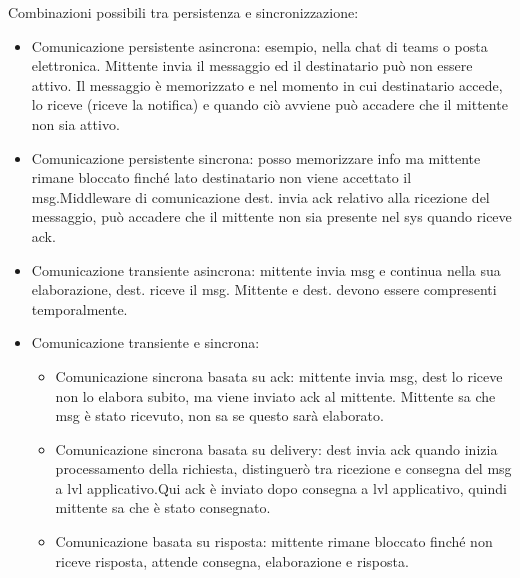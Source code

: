 \documentclass[16px]{article}
\begin{document}
Combinazioni possibili tra persistenza e sincronizzazione:\\
\begin{itemize}
\item Comunicazione persistente asincrona:
esempio, nella chat di teams o posta elettronica. Mittente invia il messaggio ed il destinatario può non essere attivo. Il messaggio è memorizzato e nel momento in cui destinatario accede, lo riceve (riceve la notifica) e quando ciò avviene può accadere che il mittente non sia attivo.
\item Comunicazione persistente sincrona: posso memorizzare info ma mittente rimane bloccato finché lato destinatario non viene accettato il msg.Middleware di comunicazione dest. invia ack relativo alla ricezione del messaggio, può accadere che il mittente non sia presente nel sys quando riceve ack.
\item Comunicazione transiente asincrona: mittente invia msg e continua nella sua elaborazione, dest. riceve il msg. Mittente e dest. devono essere compresenti temporalmente.
\item Comunicazione transiente e sincrona:
\begin{itemize}
\item Comunicazione sincrona basata su ack: mittente invia msg, dest lo riceve non lo elabora subito, ma viene inviato ack al mittente. Mittente sa che msg è stato ricevuto, non sa se questo sarà elaborato.
\item Comunicazione sincrona basata su delivery: dest invia ack quando inizia processamento della richiesta, distinguerò tra ricezione e consegna del msg a lvl applicativo.Qui ack è inviato dopo consegna a lvl applicativo, quindi mittente sa che è stato consegnato.
\item Comunicazione basata su risposta: mittente rimane bloccato finché non riceve risposta, attende consegna, elaborazione e risposta.
\end{itemize}
\end{itemize}
\end{document}
